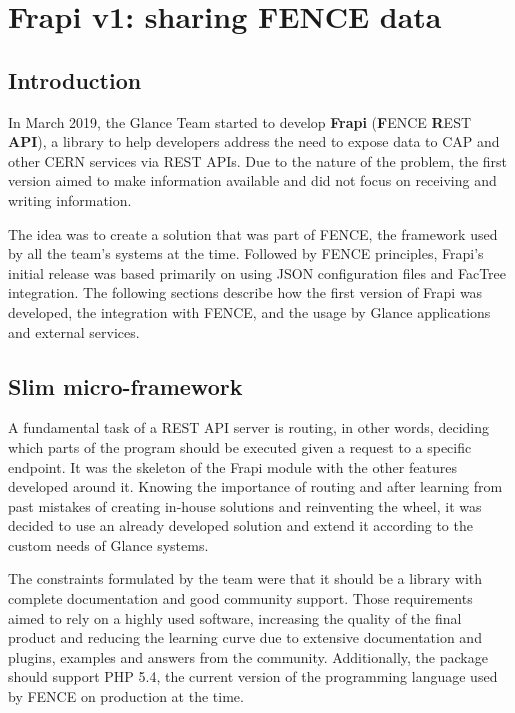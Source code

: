 \chapter{Frapi v1: sharing FENCE data}
\label{chap3}

\section{Introduction}

In March 2019, the Glance Team started to develop \textbf{Frapi} (\textbf{F}ENCE \textbf{R}EST \textbf{API}), a library to help developers address the need to expose data to CAP and other CERN services via REST APIs. Due to the nature of the problem, the first version aimed to make information available and did not focus on receiving and writing information.

The idea was to create a solution that was part of FENCE, the framework used by all the team's systems at the time. Followed by FENCE principles, Frapi's initial release was based primarily on using JSON configuration files and FacTree integration. The following sections describe how the first version of Frapi was developed, the integration with FENCE, and the usage by Glance applications and external services.

\section{Slim micro-framework}

A fundamental task of a REST API server is routing, in other words, deciding which parts of the program should be executed given a request to a specific endpoint. It was the skeleton of the Frapi module with the other features developed around it. Knowing the importance of routing and after learning from past mistakes of creating in-house solutions and reinventing the wheel, it was decided to use an already developed solution and extend it according to the custom needs of Glance systems.

The constraints formulated by the team were that it should be a library with complete documentation and good community support. Those requirements aimed to rely on a highly used software, increasing the quality of the final product and reducing the learning curve due to extensive documentation and plugins, examples and answers from the community. Additionally, the package should support PHP 5.4, the current version of the programming language used by FENCE on production at the time.

